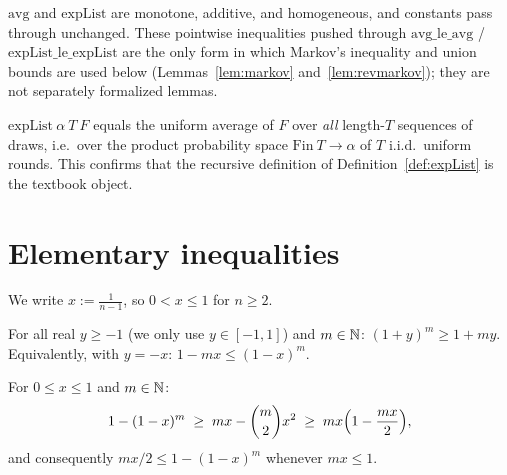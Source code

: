 \begin{lemma}\label{lem:avg-basic}
  \leanok
  $\mathrm{avg}$ and $\mathrm{expList}$ are monotone, additive, and
  homogeneous, and constants pass through unchanged. These pointwise
  inequalities pushed through $\mathrm{avg\_le\_avg}$ /
  $\mathrm{expList\_le\_expList}$ are the only form in which Markov's
  inequality and union bounds are used below (Lemmas~\ref{lem:markov}
  and~\ref{lem:revmarkov}); they are not separately formalized lemmas.
\end{lemma}

\begin{theorem}\label{thm:faithful}
  \leanok
  $\mathrm{expList}\ \alpha\ T\ F$ equals the uniform average of $F$ over
  \emph{all} length-$T$ sequences of draws, i.e.\ over the product
  probability space $\mathrm{Fin}\ T \to \alpha$ of $T$ i.i.d.\ uniform
  rounds. This confirms that the recursive definition of
  Definition~\ref{def:expList} is the textbook object.
\end{theorem}

\section{Elementary inequalities}\label{sec:ineq}

We write $x := \tfrac{1}{n-1}$, so $0 < x \le 1$ for $n \ge 2$.

\begin{lemma}[Bernoulli]\label{lem:bernoulli}
  \leanok
  For all real $y \ge -1$ (we only use $y\in[-1,1]$) and $m \in \mathbb{N}$:
  $(1+y)^m \ge 1 + my$. Equivalently, with $y = -x$:
  $1 - mx \le (1-x)^m$.
\end{lemma}

\begin{lemma}\label{lem:bonferroni}
  \leanok
  For $0 \le x \le 1$ and $m \in \mathbb{N}$:
  \[
    1-(1-x)^m \;\ge\; mx - \binom{m}{2}x^2 \;\ge\; mx\Bigl(1-\frac{mx}{2}\Bigr),
  \]
  and consequently $mx/2 \le 1-(1-x)^m$ whenever $mx \le 1$.
\end{lemma}

